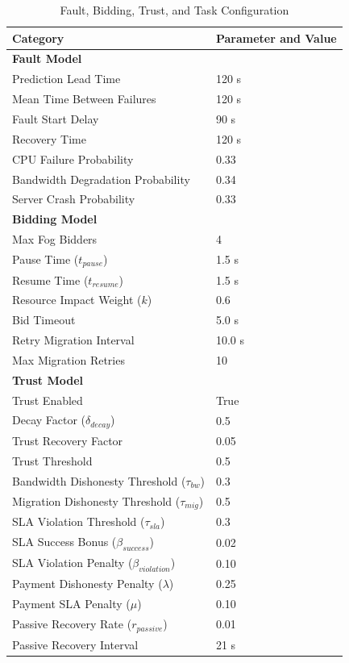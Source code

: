 \documentclass{article}
\begin{document}
\begin{table}[h!]
\centering
\caption{Fault, Bidding, Trust, and Task Configuration}
\label{tab:workload_fault_config}
\begin{tabular}{ll}
\toprule
\textbf{Category} & \textbf{Parameter and Value} \\
\midrule
\textbf{Fault Model} &  \\
Prediction Lead Time & 120 s \\
Mean Time Between Failures & 120 s \\
Fault Start Delay & 90 s \\
Recovery Time & 120 s \\
CPU Failure Probability & 0.33 \\
Bandwidth Degradation Probability & 0.34 \\
Server Crash Probability & 0.33 \\
\midrule
\textbf{Bidding Model} &  \\
Max Fog Bidders & 4 \\
Pause Time ($t_{pause}$) & 1.5 s \\
Resume Time ($t_{resume}$) & 1.5 s \\
Resource Impact Weight ($k$) & 0.6 \\
Bid Timeout & 5.0 s \\
Retry Migration Interval & 10.0 s \\
Max Migration Retries & 10 \\
\midrule
\textbf{Trust Model} &  \\
Trust Enabled & True \\
Decay Factor ($\delta_{decay}$) & 0.5 \\
Trust Recovery Factor & 0.05 \\
Trust Threshold & 0.5 \\
Bandwidth Dishonesty Threshold ($\tau_{bw}$) & 0.3 \\
Migration Dishonesty Threshold ($\tau_{mig}$) & 0.5 \\
SLA Violation Threshold ($\tau_{sla}$) & 0.3 \\
SLA Success Bonus ($\beta_{success}$) & 0.02 \\
SLA Violation Penalty ($\beta_{violation}$) & 0.10 \\
Payment Dishonesty Penalty ($\lambda$) & 0.25 \\
Payment SLA Penalty ($\mu$) & 0.10 \\
Passive Recovery Rate ($r_{passive}$) & 0.01 \\
Passive Recovery Interval & 21 s \\

\end{tabular}
\end{table}
\end{document}
